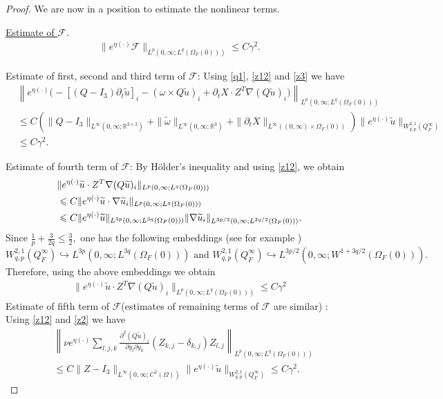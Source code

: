 \documentclass[12pt,a4paper,reqno]{amsart}
\theoremstyle{definition}
\theoremstyle{remark}
\numberwithin{equation}{section}
\newcommand{\ofo}{\Omega_{F}(0)}
\newcommand{\rt}{\mathbb{R}^{3}}
\newcommand{\ds}{\displaystyle}
\begin{document}
\begin{proof}
We are now in a position to estimate the nonlinear terms.

\underline{Estimate of $\mathcal{F}.$}
\begin{align} \label{f1-e}
\|e^{\eta (\cdot)}\mathcal{F}\|_{L^{p}(0,\infty;L^{q}(\ofo))} \leqslant C \gamma^{2}.
\end{align}

 \noindent \textbullet Estimate of first, second and third term of $\mathcal{F}$:  Using  \eqref{q1}, \eqref{z12} and \eqref{z3} we have
 \begin{align*}
 &\left\| e^{\eta(\cdot)}\Big(- [(Q-I_{3}) \partial_{t} \widetilde u]_{i} -(\omega \times Q\widetilde u)_{i} + \partial_{t} X  \cdot Z^{T} \nabla (Q\widetilde u)_{i}\Big)\right\|_{L^{p}(0,\infty;L^{q}(\ofo))} \\
 &\leqslant C \left( \|Q - I_{3}\|_{L^{\infty}(0,\infty;\mathbb{R}^{3\times 3})} + \|\widetilde \omega\|_{L^{\infty}(0,\infty;\rt)} + \|\partial_{t} X\|_{L^{\infty}((0,\infty)\times \ofo)}\right) \|e^{\eta(\cdot)} \widetilde u\|_{W^{2,1}_{q,p}(Q^{\infty}_{F})} \\
 & \leqslant C\gamma^{2}.
 \end{align*}

 \noindent  \textbullet Estimate of fourth term of $\mathcal{F}$: By H\"older's inequality and using \eqref{z12},  we obtain
 \begin{align*}
 &\|e^{\eta(\cdot)}\widetilde u  \cdot Z^{T} \nabla (Q\widetilde u)_{i}\|_{L^{p}(0,\infty;L^{q}(\ofo))} \notag \\
 & \leqslant  C \|e^{\eta(\cdot)}\widetilde u  \cdot  \nabla \widetilde u_{i}\|_{L^{p}(0,\infty;L^{q}(\ofo))} \notag \\
 & \leqslant C \|e^{\eta(\cdot)}\widetilde u\|_{L^{3p}(0,\infty;L^{3q}(\ofo))} \|\nabla \widetilde u_{i}\|_{L^{3p/2}(0,\infty;L^{3q/2}(\ofo))}.
 \end{align*}
Since $\ds \frac{1}{p} + \frac{3}{2q} \leqslant \frac{3}{2},$ one has the following  embeddings (see for example \cite[Proposition 4.3]{Gei13} )
$$W^{2,1}_{q,p}(Q^{\infty}_{F}) \hookrightarrow L^{3p}(0,\infty;L^{3q}(\ofo)) \mbox{ and } W^{2,1}_{q,p}(Q^{\infty}_{F}) \hookrightarrow L^{3p/2}(0,\infty;W^{1+3q/2}(\ofo)).$$
Therefore, using the above embeddings we obtain
\begin{align*}
\|e^{\eta(\cdot)}\widetilde u  \cdot Z^{T} \nabla (Q\widetilde u)_{i}\|_{L^{p}(0,\infty;L^{q}(\ofo))} \leqslant C\gamma^{2}
\end{align*}
\noindent  \textbullet Estimate of fifth term of $\mathcal{F}$(estimates of remaining terms of  $\mathcal{F}$ are similar) : Using \eqref{z12} and \eqref{z2} we have
\begin{align*}
&\left\| \nu e^{\eta(\cdot)}\sum_{l,j,k} \frac{\partial^2 (Q\tilde u)_{i} }{\partial y_l\partial y_k}  \left(Z_{k,j}  - \delta_{k,j}\right) Z_{l,j} \right\|_{L^{p}(0,\infty;L^{q}(\ofo))} \\
& \leqslant C  \|Z - I_{3}\|_{L^{\infty}(0,\infty;C^{2}(\Omega))} \|e^{\eta(\cdot)} \widetilde u\|_{W^{2,1}_{q,p}(Q^{\infty}_{F})} \leqslant C \gamma^{2}.
\end{align*}


\end{proof}
\end{document}
